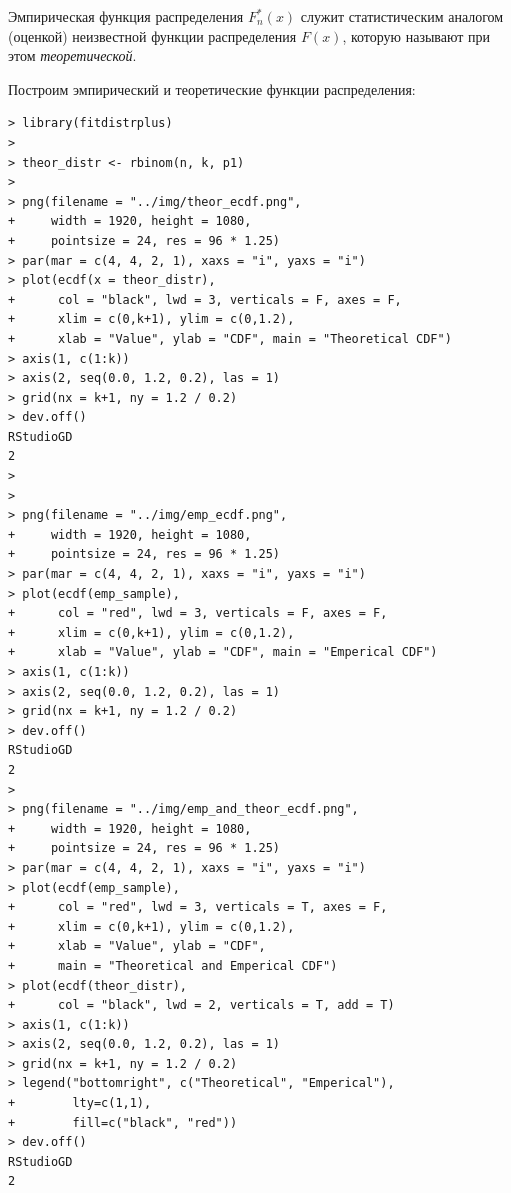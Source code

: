 \documentclass[14pt,a4paper]{scrartcl}
\begin{document}
Эмпирическая функция распределения $F_n^{*}( x )$ служит статистическим аналогом (оценкой) неизвестной функции распределения $F(x)$, которую называют при этом \textit{теоретической}.

Построим эмпирический и теоретические функции распределения:
\begin{lstlisting}
> library(fitdistrplus)
> 
> theor_distr <- rbinom(n, k, p1)
> 
> png(filename = "../img/theor_ecdf.png", 
+     width = 1920, height = 1080,
+     pointsize = 24, res = 96 * 1.25)
> par(mar = c(4, 4, 2, 1), xaxs = "i", yaxs = "i")
> plot(ecdf(x = theor_distr), 
+      col = "black", lwd = 3, verticals = F, axes = F,
+      xlim = c(0,k+1), ylim = c(0,1.2),
+      xlab = "Value", ylab = "CDF", main = "Theoretical CDF")
> axis(1, c(1:k))
> axis(2, seq(0.0, 1.2, 0.2), las = 1)
> grid(nx = k+1, ny = 1.2 / 0.2)
> dev.off()
RStudioGD 
2 
> 
> 
> png(filename = "../img/emp_ecdf.png", 
+     width = 1920, height = 1080,
+     pointsize = 24, res = 96 * 1.25)
> par(mar = c(4, 4, 2, 1), xaxs = "i", yaxs = "i")
> plot(ecdf(emp_sample), 
+      col = "red", lwd = 3, verticals = F, axes = F,
+      xlim = c(0,k+1), ylim = c(0,1.2),
+      xlab = "Value", ylab = "CDF", main = "Emperical CDF")
> axis(1, c(1:k))
> axis(2, seq(0.0, 1.2, 0.2), las = 1)
> grid(nx = k+1, ny = 1.2 / 0.2)
> dev.off()
RStudioGD 
2 
> 
> png(filename = "../img/emp_and_theor_ecdf.png", 
+     width = 1920, height = 1080,
+     pointsize = 24, res = 96 * 1.25)
> par(mar = c(4, 4, 2, 1), xaxs = "i", yaxs = "i")
> plot(ecdf(emp_sample), 
+      col = "red", lwd = 3, verticals = T, axes = F,
+      xlim = c(0,k+1), ylim = c(0,1.2),
+      xlab = "Value", ylab = "CDF", 
+      main = "Theoretical and Emperical CDF")
> plot(ecdf(theor_distr), 
+      col = "black", lwd = 2, verticals = T, add = T)
> axis(1, c(1:k))
> axis(2, seq(0.0, 1.2, 0.2), las = 1)
> grid(nx = k+1, ny = 1.2 / 0.2)
> legend("bottomright", c("Theoretical", "Emperical"), 
+        lty=c(1,1), 
+        fill=c("black", "red"))
> dev.off()
RStudioGD 
2 
\end{lstlisting}
\pagebreak
\end{document}

